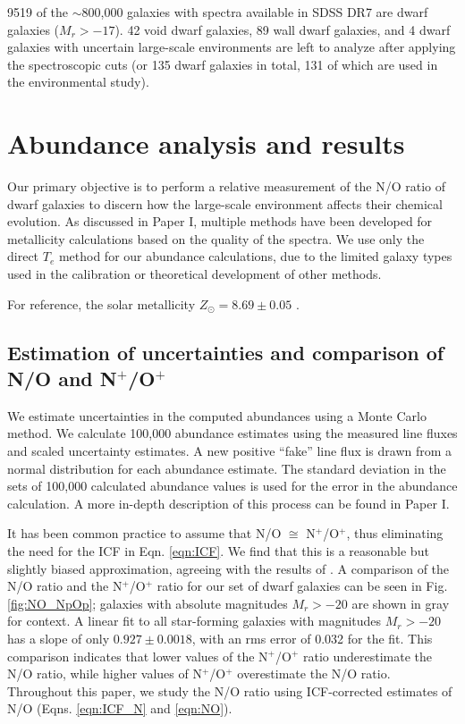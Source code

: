 9519 of the $\sim$800,000 galaxies with spectra available in SDSS DR7 are dwarf 
galaxies ($M_r > -17$).  42 void dwarf galaxies, 89 wall dwarf galaxies, and 4 
dwarf galaxies with uncertain large-scale environments are left to analyze after 
applying the spectroscopic cuts (or 135 dwarf galaxies in total, 131 of which 
are used in the environmental study).


%
%
\section[Analysis \& Results]{Abundance analysis and results}

Our primary objective is to perform a relative measurement of the N/O ratio of 
dwarf galaxies to discern how the large-scale environment affects their chemical 
evolution.  As discussed in Paper I, multiple methods have been developed for 
metallicity calculations based on the quality of the spectra.  We use only the 
direct $T_e$ method for our abundance calculations, due to the limited galaxy 
types used in the calibration or theoretical development of other methods.

For reference, the solar metallicity $Z_{\odot} = 8.69\pm 0.05$ 
\citep{Asplund09}.


\subsection{Estimation of uncertainties and comparison of N/O and N$^+$/O$^+$}

We estimate uncertainties in the computed abundances using a Monte Carlo method.  
We calculate 100,000 abundance estimates using the measured line fluxes and 
scaled uncertainty estimates.  A new positive ``fake'' line flux is drawn from a 
normal distribution for each abundance estimate.  The standard deviation in 
the sets of 100,000 calculated abundance values is used for the error in the 
abundance calculation.  A more in-depth description of this process can be found 
in Paper I.

It has been common practice to assume that N/O $\cong$ N$^+$/O$^+$, thus 
eliminating the need for the ICF in Eqn. \ref{eqn:ICF}.  We find that this is a 
reasonable but slightly biased approximation, agreeing with the results of 
\cite{Nava06}.  A comparison of the N/O ratio and the N$^+$/O$^+$ ratio for our 
set of dwarf galaxies can be seen in Fig. \ref{fig:NO_NpOp}; galaxies with 
absolute magnitudes $M_r > -20$ are shown in gray for context.  A linear fit to 
all star-forming galaxies with magnitudes $M_r > -20$ has a slope of only 
$0.927\pm 0.0018$, with an rms error of 0.032 for the fit.  This comparison 
indicates that lower values of the N$^+$/O$^+$ ratio underestimate the N/O 
ratio, while higher values of N$^+$/O$^+$ overestimate the N/O ratio.  
Throughout this paper, we study the N/O ratio using ICF-corrected estimates of 
N/O (Eqns. \ref{eqn:ICF_N} and \ref{eqn:NO}).

